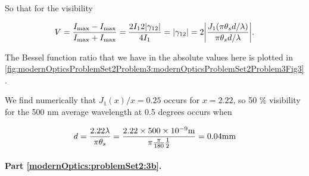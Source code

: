 {So that for the visibility 

\begin{dmath}\label{eqn:modernOptics:ProblemSet2:P3:490}
V = \frac
{
I_{\text{max}}
- I_{\text{max}}
}
{
I_{\text{max}}
+ I_{\text{max}}
}
=
\frac{2 I_1 2 \Abs{\gamma_{12}}}{4 I_1}
= \Abs{\gamma_{12}}
=
2 \Abs{\frac{J_1(\pi \theta_s d/\lambda)}{\pi \theta_s d/\lambda}}.
\end{dmath}

The Bessel function ratio that we have in the absolute values here is plotted in \cref{fig:modernOpticsProblemSet2Problem3:modernOpticsProblemSet2Problem3Fig3}.


We find numerically that $J_1(x)/x = 0.25$ occurs for $x = 2.22$, so 50 \% visibility for the 500 nm average wavelength at 0.5 degrees occurs when

\begin{dmath}\label{eqn:modernOptics:ProblemSet2:P3:510}
d 
= \frac{2.22 \lambda}{\pi \theta_s} 
= \frac{2.22 \times 500 \times 10^{-9} \text{m}}{\pi \frac{\pi}{180} \inv{2}} 
= 0.04 \text{mm}
\end{dmath}


\paragraph{Part \ref{modernOptics:problemSet2:3b}.  }

%


}
